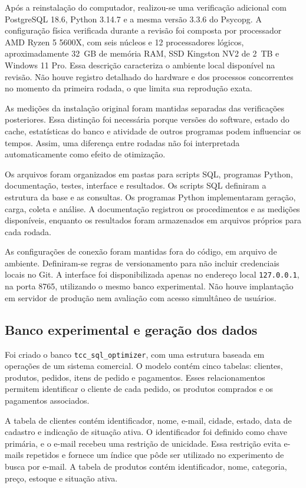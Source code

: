 \documentclass{UNESC}
\begin{document}
Após a reinstalação do computador, realizou-se uma verificação adicional com PostgreSQL 18.6, Python 3.14.7 e a mesma versão 3.3.6 do Psycopg. A configuração física verificada durante a revisão foi composta por processador AMD Ryzen 5 5600X, com seis núcleos e 12 processadores lógicos, aproximadamente 32~GB de memória RAM, SSD Kingston NV2 de 2~TB e Windows 11 Pro. Essa descrição caracteriza o ambiente local disponível na revisão. Não houve registro detalhado do hardware e dos processos concorrentes no momento da primeira rodada, o que limita sua reprodução exata.

As medições da instalação original foram mantidas separadas das verificações posteriores. Essa distinção foi necessária porque versões do software, estado do cache, estatísticas do banco e atividade de outros programas podem influenciar os tempos. Assim, uma diferença entre rodadas não foi interpretada automaticamente como efeito de otimização.

Os arquivos foram organizados em pastas para scripts SQL, programas Python, documentação, testes, interface e resultados. Os scripts SQL definiram a estrutura da base e as consultas. Os programas Python implementaram geração, carga, coleta e análise. A documentação registrou os procedimentos e as medições disponíveis, enquanto os resultados foram armazenados em arquivos próprios para cada rodada.

As configurações de conexão foram mantidas fora do código, em arquivo de ambiente. Definiram-se regras de versionamento para não incluir credenciais locais no Git. A interface foi disponibilizada apenas no endereço local \texttt{127.0.0.1}, na porta 8765, utilizando o mesmo banco experimental. Não houve implantação em servidor de produção nem avaliação com acesso simultâneo de usuários.

\subsection{Banco experimental e geração dos dados}

Foi criado o banco \texttt{tcc\_sql\_optimizer}, com uma estrutura baseada em operações de um sistema comercial. O modelo contém cinco tabelas: clientes, produtos, pedidos, itens de pedido e pagamentos. Esses relacionamentos permitem identificar o cliente de cada pedido, os produtos comprados e os pagamentos associados.

A tabela de clientes contém identificador, nome, e-mail, cidade, estado, data de cadastro e indicação de situação ativa. O identificador foi definido como chave primária, e o e-mail recebeu uma restrição de unicidade. Essa restrição evita e-mails repetidos e fornece um índice que pôde ser utilizado no experimento de busca por e-mail. A tabela de produtos contém identificador, nome, categoria, preço, estoque e situação ativa.
\end{document}
